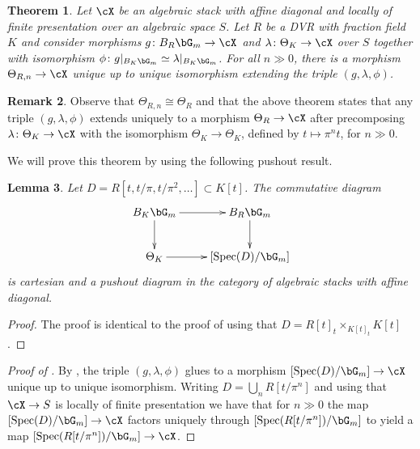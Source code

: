 \documentclass[a4paper]{amsart}
\numberwithin{equation}{section}
\theoremstyle{plain}
\newtheorem{thm}{Theorem}[section]
\newtheorem{lem}[thm]{Lemma}
\theoremstyle{definition}
\newtheorem{rem}[thm]{Remark}
\DeclareMathOperator{\Spec}{Spec}
\newcommand{\co}{\colon}
\begin{document}
\begin{thm} \label{T:strange-gluing2}
Let $\cX$ be an algebraic stack with affine diagonal and locally of finite presentation over an algebraic space $S$. Let $R$ be a DVR with fraction field $K$ and consider morphisms $g \co B_R \bG_m \to \cX$ and $\lambda \co \Theta_K \to \cX$ over $S$ together with isomorphism $\phi \co g|_{B_K \bG_m} \simeq \lambda|_{B_K \bG_m}$. For all $n\gg 0$, there is a morphism $\Theta_{R,n} \to \cX$ unique up to unique isomorphism extending the triple $(g, \lambda, \phi)$. 
\end{thm}

\begin{rem} Observe that $\Theta_{R,n} \cong \Theta_R$ and that the above theorem states that any triple $(g, \lambda, \phi)$ extends uniquely to a morphism $\Theta_R \to \cX$ after precomposing $\lambda \co \Theta_K \to \cX$ with the isomorphism $\Theta_K \to \Theta_K$, defined by $t \mapsto \pi^n t$, for $n \gg 0$.
\end{rem}

We will prove this theorem by using the following pushout result.

\begin{lem} \label{L:pushout3}
Let $D = R[t, t/\pi,t/\pi^2,\ldots] \subset K[t]$. The commutative diagram
\begin{equation} \label{D:pushout2}
\begin{split}
\xymatrix{
B_K \bG_m \ar[r] \ar[d]		& B_R \bG_m \ar[d] \\
\Theta_K \ar[r]			& [\Spec(D)/\bG_m]
}
\end{split}
\end{equation}
is cartesian and a pushout diagram in the category of algebraic stacks with affine diagonal.
\end{lem}

\begin{proof}
The proof is identical to the proof of  using that $D = R[t]_t \times_{K[t]_t} K[t]$.
\end{proof}


\begin{proof}[Proof of ]
By , the triple $(g, \lambda, \phi)$ glues to a morphism $[\Spec(D) / \bG_m] \to \cX$ unique up to unique isomorphism. Writing $D = \bigcup_n R[t/\pi^n]$ and using that $\cX \to S$ is locally of finite presentation we have that for $n \gg 0$ the map $[\Spec(D) / \bG_m] \to \cX$ factors uniquely through $[\Spec(R[t/\pi^n])/\bG_m]$ to yield a map  $[\Spec(R[t/\pi^n])/\bG_m] \to \cX$. 
\end{proof}
\end{document}
